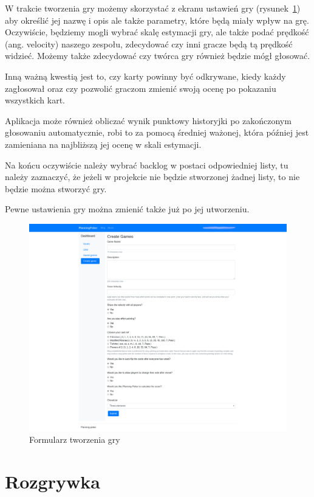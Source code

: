 W trakcie tworzenia gry możemy skorzystać z ekranu ustawień gry (rysunek~\ref{rys:form})
aby określić jej nazwę i opis ale także parametry, które będą miały wpływ na grę.
Oczywiście, będziemy mogli wybrać skalę estymacji gry, ale także podać prędkość (ang. velocity)
naszego zespołu, zdecydować czy inni gracze będą tą prędkość widzieć.
Możemy także zdecydować czy twórca gry również będzie mógł głosować.

Inną ważną kwestią jest to, czy karty powinny być odkrywane, kiedy każdy zagłosował
oraz czy pozwolić graczom zmienić swoją ocenę po pokazaniu wszystkich kart.

Aplikacja może również obliczać wynik punktowy historyjki po zakończonym głosowaniu automatycznie,
robi to za pomocą średniej ważonej, która później jest zamieniana na najbliższą jej ocenę w skali estymacji.

Na końcu oczywiście należy wybrać backlog w postaci odpowiedniej listy, tu należy zaznaczyć,
że jeżeli w projekcie nie będzie stworzonej żadnej listy, to nie będzie można stworzyć gry.

Pewne ustawienia gry można zmienić także już po jej utworzeniu.

\begin{figure}[h]
	\centering\includegraphics[width=\textwidth]{img/Formularz}
	\caption{Formularz tworzenia gry}\label{rys:form}%
\end{figure}

\section{Rozgrywka}

